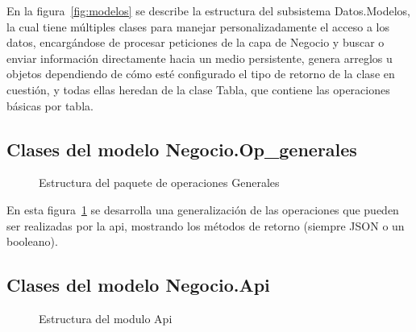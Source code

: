     En la figura~\ref{fig:modelos} se describe la estructura del subsistema Datos.Modelos, la cual tiene múltiples clases para manejar personalizadamente el acceso a los datos, encargándose de procesar peticiones de la capa de Negocio y buscar o enviar información directamente hacia un medio persistente, genera arreglos u objetos dependiendo de cómo esté configurado el tipo de retorno de la clase en cuestión, y todas ellas heredan de la clase Tabla, que contiene las operaciones básicas por tabla.
    
    \subsection{Clases del modelo Negocio.Op\_generales}
    
    \begin{figure}[htbp!]
    	\begin{center}
    		\caption{Estructura del paquete de operaciones Generales}
    		\label{fig:op_generales}
    	\end{center}
    \end{figure}
    
    En esta figura~\ref{fig:op_generales} se desarrolla una generalización de las operaciones que pueden ser realizadas por la api, mostrando los métodos de retorno (siempre JSON o un booleano). 
    
    \subsection{Clases del modelo Negocio.Api}
    
    \begin{figure}[htbp!]
    	\begin{center}
    		\caption{Estructura del modulo Api}
    		\label{fig:api}
    	\end{center}
    \end{figure}
    
